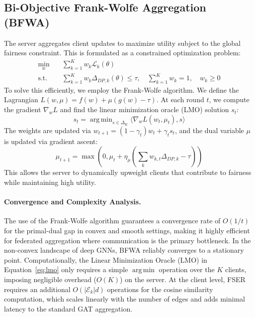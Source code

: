 \documentclass[pmlr]{jmlr}%
\DeclareMathOperator*{\argmin}{arg\,min}
\begin{document}
\subsection{Bi-Objective Frank-Wolfe Aggregation (BFWA)}
The server aggregates client updates to maximize utility subject to the global fairness constraint. This is formulated as a constrained optimization problem:
\begin{align}
\min_{w} \quad & \sum_{k=1}^{K} w_k \mathcal{L}_k(\theta) \label{eq:bfwa_obj}\\
\text{s.t.} \quad & \sum_{k=1}^{K} w_k \Delta_{DP,k}(\theta) \le \tau, \quad \sum_{k=1}^K w_k = 1, \quad w_k \ge 0 \label{eq:bfwa_constraint}
\end{align}
To solve this efficiently, we employ the Frank-Wolfe algorithm. We define the Lagrangian $L(w,\mu) = f(w) + \mu(g(w) - \tau)$. At each round $t$, we compute the gradient $\nabla_w L$ and find the linear minimization oracle (LMO) solution $s_t$:
\begin{equation}
s_t = \argmin_{s \in \Delta_K} \langle \nabla_w L(w_t,\mu_t), s\rangle
\label{eq:lmo}
\end{equation}
The weights are updated via $w_{t+1} = (1-\gamma_t)w_t + \gamma_t s_t$, and the dual variable $\mu$ is updated via gradient ascent:
\begin{equation}
\mu_{t+1} = \max\left(0, \mu_t + \eta_\mu\left(\sum_k w_{k,t}\Delta_{DP,k} - \tau\right)\right)
\label{eq:bfwa_dual}
\end{equation}
This allows the server to dynamically upweight clients that contribute to fairness while maintaining high utility.

\paragraph{Convergence and Complexity Analysis.}
The use of the Frank-Wolfe algorithm guarantees a convergence rate of $O(1/t)$ for the primal-dual gap in convex and smooth settings, making it highly efficient for federated aggregation where communication is the primary bottleneck. In the non-convex landscape of deep GNNs, BFWA reliably converges to a stationary point. Computationally, the Linear Minimization Oracle (LMO) in Equation~\eqref{eq:lmo} only requires a simple $\argmin$ operation over the $K$ clients, imposing negligible overhead ($O(K)$) on the server. At the client level, FSER requires an additional $O(|\mathcal{E}_k|d)$ operations for the cosine similarity computation, which scales linearly with the number of edges and adds minimal latency to the standard GAT aggregation.
\end{document}
